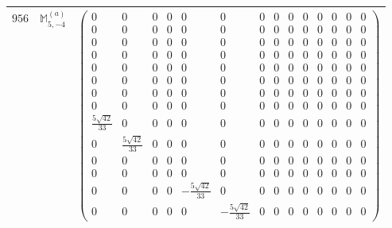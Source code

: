 \documentclass[fleqn,8pt,landscape]{jsarticle}
\begin{document}
\begin{center}
\begin{longtable}{ccc}
$ 956 $ & $ \mathbb{M}_{5,-4}^{(a)} $ & $ \begin{pmatrix} 0 & 0 & 0 & 0 & 0 & 0 & 0 & 0 & 0 & 0 & 0 & 0 & 0 & 0 \\ 0 & 0 & 0 & 0 & 0 & 0 & 0 & 0 & 0 & 0 & 0 & 0 & 0 & 0 \\ 0 & 0 & 0 & 0 & 0 & 0 & 0 & 0 & 0 & 0 & 0 & 0 & 0 & 0 \\ 0 & 0 & 0 & 0 & 0 & 0 & 0 & 0 & 0 & 0 & 0 & 0 & 0 & 0 \\ 0 & 0 & 0 & 0 & 0 & 0 & 0 & 0 & 0 & 0 & 0 & 0 & 0 & 0 \\ 0 & 0 & 0 & 0 & 0 & 0 & 0 & 0 & 0 & 0 & 0 & 0 & 0 & 0 \\ 0 & 0 & 0 & 0 & 0 & 0 & 0 & 0 & 0 & 0 & 0 & 0 & 0 & 0 \\ 0 & 0 & 0 & 0 & 0 & 0 & 0 & 0 & 0 & 0 & 0 & 0 & 0 & 0 \\ \frac{5 \sqrt{42}}{33} & 0 & 0 & 0 & 0 & 0 & 0 & 0 & 0 & 0 & 0 & 0 & 0 & 0 \\ 0 & \frac{5 \sqrt{42}}{33} & 0 & 0 & 0 & 0 & 0 & 0 & 0 & 0 & 0 & 0 & 0 & 0 \\ 0 & 0 & 0 & 0 & 0 & 0 & 0 & 0 & 0 & 0 & 0 & 0 & 0 & 0 \\ 0 & 0 & 0 & 0 & 0 & 0 & 0 & 0 & 0 & 0 & 0 & 0 & 0 & 0 \\ 0 & 0 & 0 & 0 & - \frac{5 \sqrt{42}}{33} & 0 & 0 & 0 & 0 & 0 & 0 & 0 & 0 & 0 \\ 0 & 0 & 0 & 0 & 0 & - \frac{5 \sqrt{42}}{33} & 0 & 0 & 0 & 0 & 0 & 0 & 0 & 0 \end{pmatrix} $ \\ \hline

\end{longtable}
\end{center}
\end{document}
